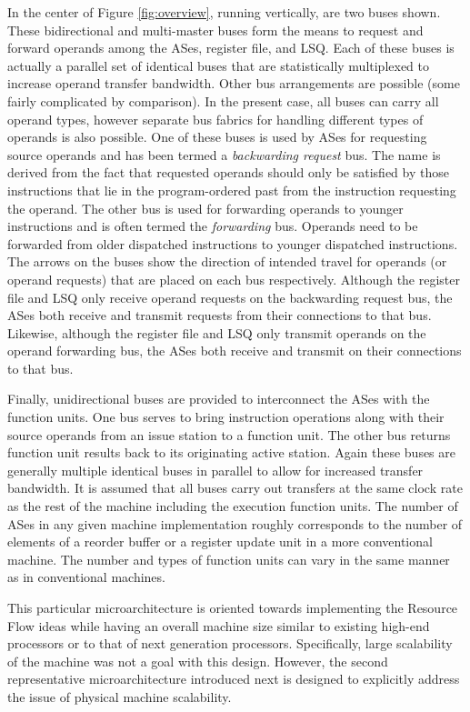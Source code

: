 \documentclass{book}
\begin{document}
In the center of Figure \ref{fig:overview},
running vertically, are two buses shown.
These bidirectional and multi-master buses 
form the means to request and forward operands
among the ASes, register file, and LSQ.
Each of these buses is actually a parallel set of identical buses
that are statistically multiplexed to increase operand transfer
bandwidth.  
Other bus arrangements are possible (some fairly complicated by
comparison).  
In the present case, all buses can carry all operand types,
however separate bus fabrics for handling
different types of operands is also possible.
One of these buses is used by ASes
for requesting source operands and
has been termed a \textit{backwarding request} bus.
The name is derived from the fact that requested operands should
only be satisfied by those instructions that lie in the program-ordered
past from the instruction requesting the operand.
The other bus is used for forwarding operands to younger instructions
and is often termed the \textit{forwarding} bus.
Operands need to be forwarded from older dispatched
instructions to younger dispatched instructions.
The arrows on the buses show the direction of intended travel
for operands (or operand requests) that are placed on each bus
respectively.  Although the register file and LSQ only receive
operand requests on the backwarding request bus, the ASes
both receive and transmit requests from their connections to that
bus.  Likewise, although the register file and LSQ only transmit
operands on the operand forwarding bus, the ASes
both receive and transmit on their connections to that bus.

Finally, unidirectional buses are provided to interconnect
the ASes with the function units.
One bus serves to bring instruction
operations along with their source operands from an issue
station to a function unit.
The other bus returns function unit results back to its
originating active station.
Again these buses are generally multiple identical buses in
parallel to allow for increased transfer bandwidth.
It is assumed that all buses carry out transfers at the same
clock rate as the rest of the machine including the execution
function units.
The number of ASes in
any given machine implementation roughly corresponds to the
number of elements of a reorder buffer or a register update unit
in a more conventional machine.
The number and types of function units can vary in the same
manner as in conventional machines.

This particular microarchitecture is oriented towards
implementing the Resource Flow ideas while having an overall
machine size similar to existing high-end processors or to that
of next generation processors.
Specifically, large scalability of the machine was not a goal
with this design.
However, the second representative microarchitecture introduced
next is designed to explicitly address the issue of physical
machine scalability.
%
%
\end{document}
